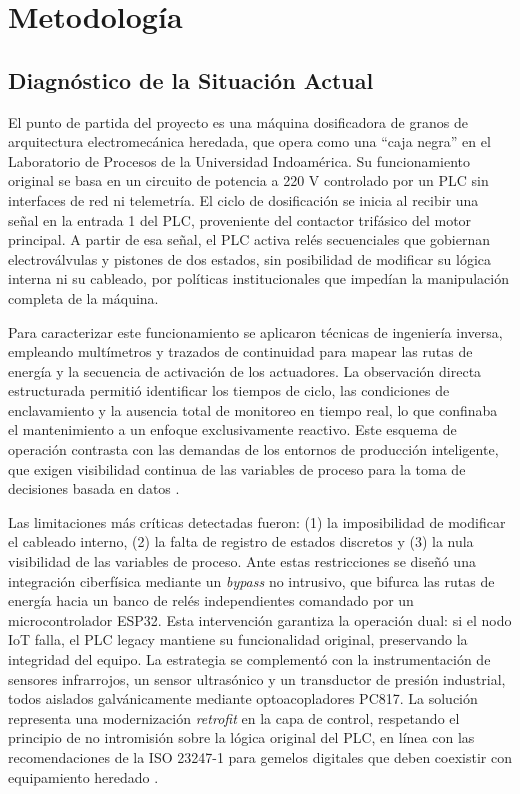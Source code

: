 \chapter{Metodología}
\label{chap:metodologia}

\section{Diagnóstico de la Situación Actual}

El punto de partida del proyecto es una máquina dosificadora de granos de arquitectura electromecánica heredada, que opera como una ``caja negra'' en el Laboratorio de Procesos de la Universidad Indoamérica. Su funcionamiento original se basa en un circuito de potencia a 220 V controlado por un PLC sin interfaces de red ni telemetría. El ciclo de dosificación se inicia al recibir una señal en la entrada 1 del PLC, proveniente del contactor trifásico del motor principal. A partir de esa señal, el PLC activa relés secuenciales que gobiernan electroválvulas y pistones de dos estados, sin posibilidad de modificar su lógica interna ni su cableado, por políticas institucionales que impedían la manipulación completa de la máquina.

Para caracterizar este funcionamiento se aplicaron técnicas de ingeniería inversa, empleando multímetros y trazados de continuidad para mapear las rutas de energía y la secuencia de activación de los actuadores. La observación directa estructurada permitió identificar los tiempos de ciclo, las condiciones de enclavamiento y la ausencia total de monitoreo en tiempo real, lo que confinaba el mantenimiento a un enfoque exclusivamente reactivo. Este esquema de operación contrasta con las demandas de los entornos de producción inteligente, que exigen visibilidad continua de las variables de proceso para la toma de decisiones basada en datos \cite{retrofitting2025}.

Las limitaciones más críticas detectadas fueron: (1) la imposibilidad de modificar el cableado interno, (2) la falta de registro de estados discretos y (3) la nula visibilidad de las variables de proceso. Ante estas restricciones se diseñó una integración ciberfísica mediante un \textit{bypass} no intrusivo, que bifurca las rutas de energía hacia un banco de relés independientes comandado por un microcontrolador ESP32. Esta intervención garantiza la operación dual: si el nodo IoT falla, el PLC legacy mantiene su funcionalidad original, preservando la integridad del equipo. La estrategia se complementó con la instrumentación de sensores infrarrojos, un sensor ultrasónico y un transductor de presión industrial, todos aislados galvánicamente mediante optoacopladores PC817. La solución representa una modernización \textit{retrofit} en la capa de control, respetando el principio de no intromisión sobre la lógica original del PLC, en línea con las recomendaciones de la ISO 23247-1 para gemelos digitales que deben coexistir con equipamiento heredado \cite{iso23247-1}.

